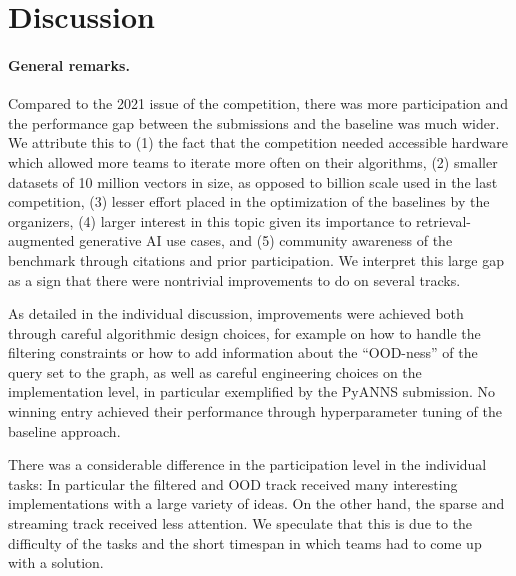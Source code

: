 \section{Discussion}
\label{sec:discussion}

\paragraph{General remarks.}
 Compared to the 2021 issue of the competition, there was more participation and the
performance gap between the submissions and the baseline was much wider. 
We attribute this to 
(1) the fact that the competition needed accessible hardware which allowed more teams to iterate more often on their algorithms,
(2) smaller datasets of 10 million vectors in size, as opposed to billion scale used in the last competition, 
(3) lesser effort placed in the optimization of the baselines by the organizers,
(4) larger interest in this topic given its importance to retrieval-augmented generative AI use cases, and
(5) community awareness of the benchmark through citations and prior participation.
%
We interpret this large gap as a sign that there were nontrivial improvements to do on several tracks. 

As detailed in the individual discussion, improvements were achieved both through careful algorithmic design choices, for example on how to handle the filtering constraints or how to add information about the ``OOD-ness'' of the query set to the graph, as well as careful engineering choices on the implementation level, in particular exemplified by the PyANNS submission.
No winning entry achieved their performance through hyperparameter tuning of the baseline approach.

There was a considerable difference in the participation level in the individual tasks: In particular the filtered and OOD track received many interesting implementations with a large variety of ideas. On the other hand, 
the sparse and streaming track received less attention. We speculate that this is due to the difficulty of the tasks and the short timespan in which teams had to come up with a solution.

